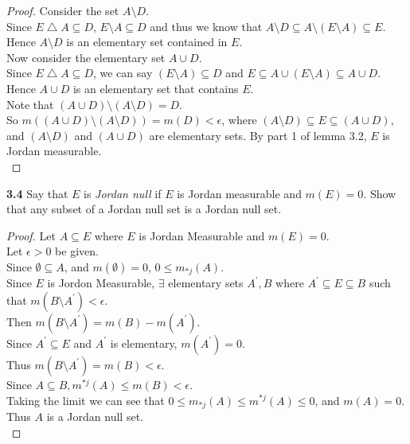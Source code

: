 \documentclass[12pt]{article}
\begin{document}
\begin{proof}
		Consider the set $A \setminus D$. \\
		Since $E \bigtriangleup A \subseteq D$, $E \setminus A \subseteq D$ and thus we know that $A \setminus D \subseteq A \setminus (E \setminus A) \subseteq E$. Hence $A \setminus D$ is an elementary set contained in $E$. \\
		
		Now consider the elementary set $A \cup D$. \\
		Since $E \bigtriangleup A \subseteq D$, we can say $(E \setminus A) \subseteq D$ and $E \subseteq A \cup (E \setminus A) \subseteq A \cup D$. \\
		Hence $A \cup D$ is an elementary set that contains $E$. \\
		
		Note that $(A \cup D) \setminus (A \setminus D) = D$.\\
		So $m((A \cup D) \setminus (A \setminus D)) = m(D) < \epsilon$, where $(A \setminus D) \subseteq E \subseteq (A \cup D)$, and $(A \setminus D)$ and $(A \cup D)$ are elementary sets. By part 1 of lemma 3.2, $E$ is Jordan measurable. \\		
	\end{proof}

\hspace{-4 ex}\textbf{3.4} Say that $E$ is \emph{Jordan null} if $E$ is Jordan measurable and $m(E)=0$. Show that any subset of a Jordan null set is a Jordan null set. \bigbreak

	\begin{proof}
		Let $A \subseteq E$ where $E$ is Jordan Measurable and $m(E)=0$. \\
		Let $\epsilon >0$ be given.\\
		Since $\emptyset \subseteq A$, and $m(\emptyset)=0$,  $0 \leq m_{*j}(A)$.\\
		Since $E$ is Jordon Measurable, $\exists$ elementary sets $A^{\prime}, B$ where $A^{\prime} \subseteq E \subseteq B$ such that $m(B \setminus A^{\prime})<\epsilon$. \\
		Then $m(B \setminus A^{\prime}) = m(B) - m(A^{\prime})$. \\
		Since $A^{\prime} \subseteq E$ and $A^\prime$ is elementary, $m(A^{\prime}) = 0$. \\
		Thus $m(B \setminus A^{\prime}) = m(B) < \epsilon$. \\
		Since $A \subseteq B, m^{*j}(A) \leq m(B) < \epsilon$. \\
		Taking the limit we can see that $0 \leq m_{*j}(A) \leq m^{*j}(A) \leq 0$, and $m(A)=0$.\\
		Thus $A$ is a Jordan null set.\\	
	\end{proof}
\end{document}
